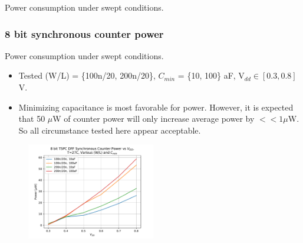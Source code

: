 \documentclass[t, screen, aspectratio=43]{beamer}
\begin{document}
\begin{frame}
\begin{block}{Power consumption under swept conditions.}
\begin{figure}[htb!]
\begin{subfigure}{0.5\textwidth}
	    \end{subfigure}
	\end{figure}

	\end{block}	
\end{frame}

\begin{frame}
	\frametitle{8 bit synchronous counter power}
	\begin{block}{Power consumption under swept conditions.}
	\tiny
	\begin{itemize}[itemsep=4pt,label=\protect---]
		\item Tested (W/L) = \{100n/20, 200n/20\}, $C_{min}$ = \{10, 100\} aF, V$_{dd} \in [0.3, 0.8]$ V. 
		\item Minimizing capacitance is most favorable for power. However, it is expected that 50 $\mu$W of counter power will only increase average power by $<< 1 \mu$W. So all circumstance tested here appear acceptable.
	\end{itemize}
	\begin{figure}[htb!]
	        \centering
	        \includegraphics[width=0.5\textwidth, angle=0]{tspc_sync_counter_power.pdf}
	\end{figure}

	\end{block}	
\end{frame}
\end{document}
